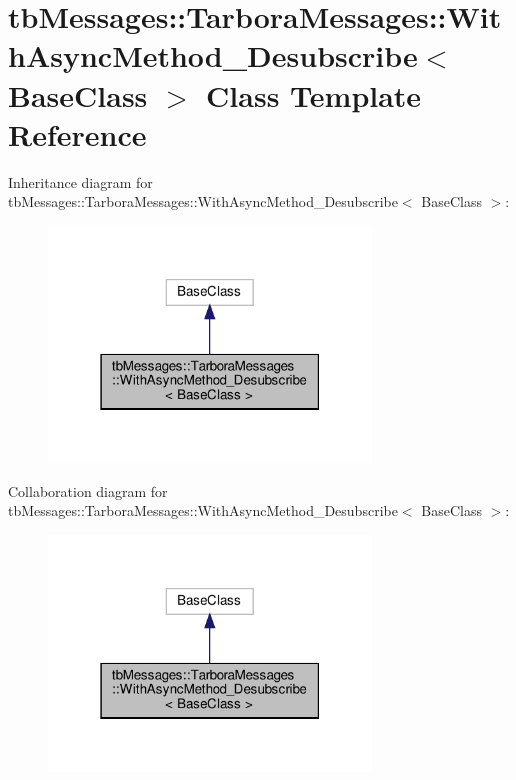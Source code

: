 \hypertarget{classtbMessages_1_1TarboraMessages_1_1WithAsyncMethod__Desubscribe}{}\section{tb\+Messages\+:\+:Tarbora\+Messages\+:\+:With\+Async\+Method\+\_\+\+Desubscribe$<$ Base\+Class $>$ Class Template Reference}
\label{classtbMessages_1_1TarboraMessages_1_1WithAsyncMethod__Desubscribe}


Inheritance diagram for tb\+Messages\+:\+:Tarbora\+Messages\+:\+:With\+Async\+Method\+\_\+\+Desubscribe$<$ Base\+Class $>$\+:
\nopagebreak
\begin{figure}[H]
\begin{center}
\leavevmode
\includegraphics[width=243pt]{classtbMessages_1_1TarboraMessages_1_1WithAsyncMethod__Desubscribe__inherit__graph}
\end{center}
\end{figure}


Collaboration diagram for tb\+Messages\+:\+:Tarbora\+Messages\+:\+:With\+Async\+Method\+\_\+\+Desubscribe$<$ Base\+Class $>$\+:
\nopagebreak
\begin{figure}[H]
\begin{center}
\leavevmode
\includegraphics[width=243pt]{classtbMessages_1_1TarboraMessages_1_1WithAsyncMethod__Desubscribe__coll__graph}
\end{center}
\end{figure}
